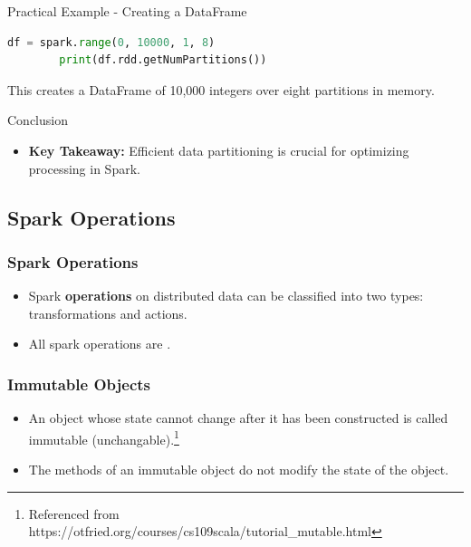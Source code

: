 \begin{frame}[fragile]{Practical Example - Creating a DataFrame}
    \begin{lstlisting}[language=Python,label={lst:pyspark-creating-dataframe}]
        df = spark.range(0, 10000, 1, 8)
        print(df.rdd.getNumPartitions())
    \end{lstlisting}
    This creates a DataFrame of 10,000 integers over eight partitions in memory.
\end{frame}

\begin{frame}{Conclusion}
    \begin{itemize}
        \item \textbf{Key Takeaway:} Efficient data partitioning is crucial for optimizing processing in Spark.
    \end{itemize}
\end{frame}

\subsection{Spark Operations}\label{subsec:spark-operations}
\begin{frame}
    \frametitle{Spark Operations}
    \begin{itemize}
        \item Spark \textbf{operations} on distributed data can be classified into two types: transformations
        and actions.
        \item All spark operations are \texttt{\color{blue}{immutable}}.
    \end{itemize}
\end{frame}
\begin{frame}
    \frametitle{Immutable Objects}
    \begin{itemize}
        \item An object whose state cannot change after it has been constructed is
called immutable (unchangable).\footnote{Referenced from https://otfried.org/courses/cs109scala/tutorial_mutable.html}
        \item  The methods of an immutable object do not modify the state of the object.
    \end{itemize}
\end{frame}

